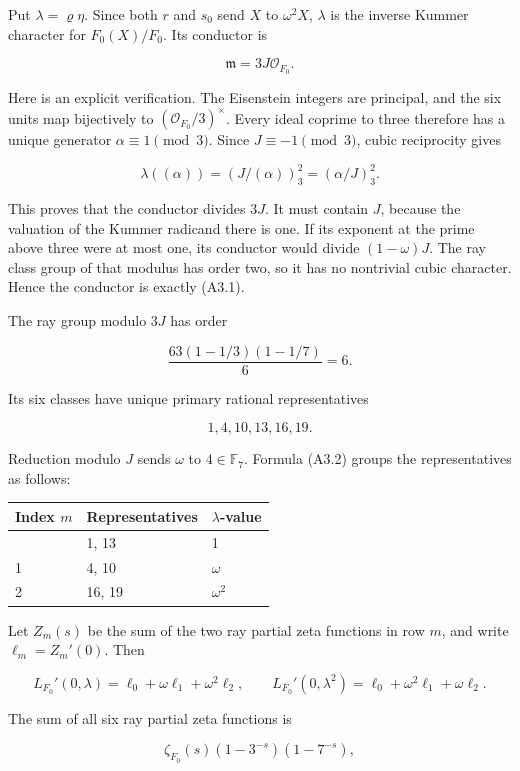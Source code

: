 Put \(\lambda=\varrho\eta\). Since both \(r\) and \(s_0\) send \(X\) to
\(\omega^2X\), \(\lambda\) is the inverse Kummer character for
\(F_0(X)/F_0\). Its conductor is

\[
\mathfrak m=3J\mathscr O_{F_0}. \tag{A3.1}
\]

Here is an explicit verification. The Eisenstein integers are principal,
and the six units map bijectively to \((\mathscr O_{F_0}/3)^\times\).
Every ideal coprime to three therefore has a unique generator
\(\alpha\equiv1\pmod3\). Since \(J\equiv-1\pmod3\), cubic reciprocity
gives

\[
\lambda((\alpha))=(J/(\alpha))_3^2=(\alpha/J)_3^2. \tag{A3.2}
\]

This proves that the conductor divides \(3J\). It must contain \(J\),
because the valuation of the Kummer radicand there is one. If its
exponent at the prime above three were at most one, its conductor would
divide \((1-\omega)J\). The ray class group of that modulus has order
two, so it has no nontrivial cubic character. Hence the conductor is
exactly (A3.1).

The ray group modulo \(3J\) has order

\[
\frac{63(1-1/3)(1-1/7)}6=6.
\]

Its six classes have unique primary rational representatives

\[
1,4,10,13,16,19.
\]

Reduction modulo \(J\) sends \(\omega\) to \(4\in\mathbb F_7\). Formula
(A3.2) groups the representatives as follows:

\begin{longtable}[]{@{}lll@{}}
\toprule\noalign{}
Index \(m\) & Representatives & \(\lambda\)-value \\
\midrule\noalign{}
\endhead
\bottomrule\noalign{}
\endlastfoot
0 & 1, 13 & 1 \\
1 & 4, 10 & \(\omega\) \\
2 & 16, 19 & \(\omega^2\) \\
\end{longtable}

Let \(Z_m(s)\) be the sum of the two ray partial zeta functions in row
\(m\), and write \(\ell_m=Z_m'(0)\). Then

\[
L_{F_0}'(0,\lambda)=\ell_0+\omega\ell_1+\omega^2\ell_2,
\qquad
L_{F_0}'(0,\lambda^2)=\ell_0+\omega^2\ell_1+\omega\ell_2. \tag{A3.3}
\]

The sum of all six ray partial zeta functions is

\[
\zeta_{F_0}(s)(1-3^{-s})(1-7^{-s}),
\]

